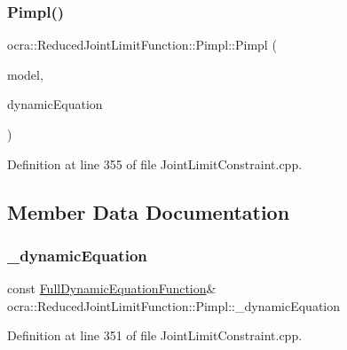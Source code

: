 \subsubsection{\texorpdfstring{Pimpl()}{Pimpl()}}
{\footnotesize\ttfamily ocra\+::\+Reduced\+Joint\+Limit\+Function\+::\+Pimpl\+::\+Pimpl (\begin{DoxyParamCaption}\item[{const Model \&}]{model,  }\item[{const \hyperlink{classocra_1_1FullDynamicEquationFunction}{Full\+Dynamic\+Equation\+Function} \&}]{dynamic\+Equation }\end{DoxyParamCaption})\hspace{0.3cm}{\ttfamily [inline]}}



Definition at line 355 of file Joint\+Limit\+Constraint.\+cpp.



\subsection{Member Data Documentation}
\hypertarget{structReducedJointLimitFunction_1_1Pimpl_ad483380d3fcdd2da03a85d22947cf31d}{}\label{structReducedJointLimitFunction_1_1Pimpl_ad483380d3fcdd2da03a85d22947cf31d} 
\subsubsection{\texorpdfstring{\+\_\+dynamic\+Equation}{\_dynamicEquation}}
{\footnotesize\ttfamily const \hyperlink{classocra_1_1FullDynamicEquationFunction}{Full\+Dynamic\+Equation\+Function}\& ocra\+::\+Reduced\+Joint\+Limit\+Function\+::\+Pimpl\+::\+\_\+dynamic\+Equation}



Definition at line 351 of file Joint\+Limit\+Constraint.\+cpp.

\hypertarget{structReducedJointLimitFunction_1_1Pimpl_ae45e80b72fb13b54452c6ce9fe9e3798}{}\label{structReducedJointLimitFunction_1_1Pimpl_ae45e80b72fb13b54452c6ce9fe9e3798} 
